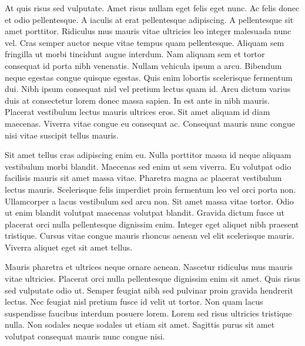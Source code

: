 At quis risus sed vulputate. Amet risus nullam eget felis eget nunc. Ac felis donec et odio pellentesque. A iaculis at erat pellentesque adipiscing. A pellentesque sit amet porttitor. Ridiculus mus mauris vitae ultricies leo integer malesuada nunc vel. Cras semper auctor neque vitae tempus quam pellentesque. Aliquam sem fringilla ut morbi tincidunt augue interdum. Nam aliquam sem et tortor consequat id porta nibh venenatis. Nullam vehicula ipsum a arcu. Bibendum neque egestas congue quisque egestas. Quis enim lobortis scelerisque fermentum dui. Nibh ipsum consequat nisl vel pretium lectus quam id. Arcu dictum varius duis at consectetur lorem donec massa sapien. In est ante in nibh mauris. Placerat vestibulum lectus mauris ultrices eros. Sit amet aliquam id diam maecenas. Viverra vitae congue eu consequat ac. Consequat mauris nunc congue nisi vitae suscipit tellus mauris.

Sit amet tellus cras adipiscing enim eu. Nulla porttitor massa id neque aliquam vestibulum morbi blandit. Maecenas sed enim ut sem viverra. Eu volutpat odio facilisis mauris sit amet massa vitae. Pharetra magna ac placerat vestibulum lectus mauris. Scelerisque felis imperdiet proin fermentum leo vel orci porta non. Ullamcorper a lacus vestibulum sed arcu non. Sit amet massa vitae tortor. Odio ut enim blandit volutpat maecenas volutpat blandit. Gravida dictum fusce ut placerat orci nulla pellentesque dignissim enim. Integer eget aliquet nibh praesent tristique. Cursus vitae congue mauris rhoncus aenean vel elit scelerisque mauris. Viverra aliquet eget sit amet tellus.

Mauris pharetra et ultrices neque ornare aenean. Nascetur ridiculus mus mauris vitae ultricies. Placerat orci nulla pellentesque dignissim enim sit amet. Quis risus sed vulputate odio ut. Semper feugiat nibh sed pulvinar proin gravida hendrerit lectus. Nec feugiat nisl pretium fusce id velit ut tortor. Non quam lacus suspendisse faucibus interdum posuere lorem. Lorem sed risus ultricies tristique nulla. Non sodales neque sodales ut etiam sit amet. Sagittis purus sit amet volutpat consequat mauris nunc congue nisi.